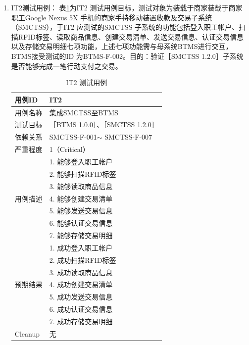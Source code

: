 \begin{enumerate}
\begin{enumerate}
				\item IT2测试用例：
					表\ref{IT2TestCase}为IT2 测试用例目标，测试对象为装载于商家装载于商家职工Google Nexus 5X 手机的商家手持移动装置收款及交易子系统（SMCTSS），于IT2 应测试的SMCTSS 子系统的功能包括登入职工帐户、扫描RFID标签、读取商品信息、创建交易清单、发送交易信息、认证交易信息以及存储交易明细七项功能，上述七项功能需与母系统BTMS进行交互，BTMS接受测试的ID 为BTMS-F-002。目的：验证［SMCTSS 1.2.0］子系统是否能够完成一笔行动支付之交易。

						\begin{table}[!htbp]
						\caption{IT2 测试用例} %
						\centering %
						\label{IT2TestCase} %
						\begin{tabular}{|l|l|}
						\hline
						用例ID & IT2 \\ \hline
						用例名称 & 集成SMCTSS至BTMS \\ \hline
						测试目标 & {［}BTMS 1.0.0{］}、{［}SMCTSS 1.2.0{］} \\ \hline
						依赖关系 & SMCTSS-F-001$\sim$ SMCTSS-F-007 \\ \hline
						严重程度 & 1（Critical） \\ \hline
						\multirow{7}{*}{用例描述} & 1.     能够登入职工帐户 \\ \cline{2-2} 
						 & 2.     能够扫描RFID标签 \\ \cline{2-2} 
						 & 3.     能够读取商品信息 \\ \cline{2-2} 
						 & 4.     能够创建交易清单 \\ \cline{2-2} 
						 & 5.     能够发送交易信息 \\ \cline{2-2} 
						 & 6.     能够认证交易信息 \\ \cline{2-2} 
						 & 7.     能够存储交易明细 \\ \hline
						\multirow{7}{*}{预期结果} & 1.     成功登入职工帐户 \\ \cline{2-2} 
						 & 2.     成功扫描RFID标签 \\ \cline{2-2} 
						 & 3.     成功读取商品信息 \\ \cline{2-2} 
						 & 4.     成功创建交易清单 \\ \cline{2-2} 
						 & 5.     成功发送交易信息 \\ \cline{2-2} 
						 & 6.     成功认证交易信息 \\ \cline{2-2} 
						 & 7.     成功存储交易明细 \\ \hline
						Cleanup & 无 \\ \hline
						\end{tabular}
						\end{table}


\end{enumerate}
\end{enumerate}
